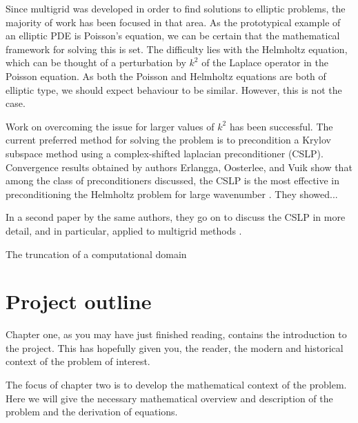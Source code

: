 Since multigrid was developed in order to find solutions to elliptic problems, the majority of work has been focused in that area.
As the prototypical example of an elliptic PDE is Poisson's equation, we can be certain that the mathematical framework for solving this is set.
The difficulty lies with the Helmholtz equation, which can be thought of a perturbation by $k^2$ of the Laplace operator in the Poisson equation.
As both the Poisson and Helmholtz equations are both of elliptic type, we should expect behaviour to be similar.
However, this is not the case.


Work on overcoming the issue for larger values of $k^2$ has been successful.
The current preferred method for solving the problem is to precondition a Krylov subspace method using a complex-shifted laplacian preconditioner (CSLP).
Convergence results obtained by authors Erlangga, Oosterlee, and Vuik show that among the class of preconditioners discussed, the CSLP is the most effective in preconditioning the Helmholtz problem for large wavenumber \cite{cslp1}.
They showed... %

In a second paper by the same authors, they go on to discuss the CSLP in more detail, and in particular, applied to multigrid methods \cite{cslp2}.



The truncation of a computational domain







\section{Project outline}

\iffalse
What is each chapter doing? What do we hope to accomplish? 
This entire chapter will need fleshing out/rewording depending on the scope of each chapter.
\fi

Chapter one, as you may have just finished reading, contains the introduction to the project.
This has hopefully given you, the reader, the modern and historical context of the problem of interest.

The focus of chapter two is to develop the mathematical context of the problem.
Here we will give the necessary mathematical overview and description of the problem and the derivation of equations.

